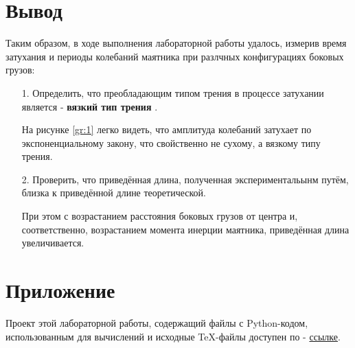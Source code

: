 \documentclass[12pt, a4paper]{article}
\begin{document}
\section{Вывод}
Таким образом, в ходе выполнения лабораторной работы удалось, измерив время затухания и периоды колебаний маятника при разлчных конфигурациях боковых грузов:
\begin{itemize}
\item[1.] Определить, что преобладающим типом трения в процессе затухании является - \textbf{вязкий тип трения} . 

На рисунке \ref{gr:1} легко видеть, что амплитуда колебаний затухает по экспоненциальному закону, что свойственно не сухому, а вязкому типу трения.

\item[2.] Проверить, что приведённая длина, полученная экспериментальынм путём, близка к приведённой длине теоретической. 

При этом с возрастанием расстояния боковых грузов от центра и, соответственно, возрастанием момента инерции маятника, приведённая длина увеличивается.

\end{itemize}


\section{Приложение}
Проект этой лабораторной работы, содержащий файлы с Python-кодом, использованным для вычислений и исходные TeX-файлы доступен по - \href{https://github.com/Dimankarp/Studies/tree/main/LaTeX/Physics%20-%20Damped%20Oscillations}{ссылке}.
\end{document}
